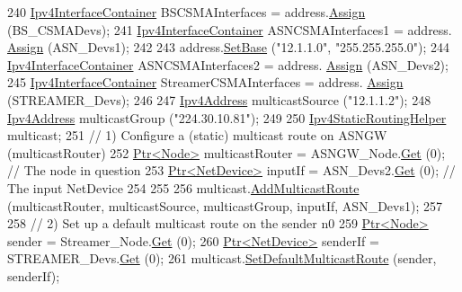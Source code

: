 \begin{DoxyCode}
240   \hyperlink{classns3_1_1Ipv4InterfaceContainer}{Ipv4InterfaceContainer} BSCSMAInterfaces = address.\hyperlink{classns3_1_1Ipv4AddressHelper_af8e7f4a1a7e74c00014a1eac445a27af}{Assign} (BS\_CSMADevs);
241   \hyperlink{classns3_1_1Ipv4InterfaceContainer}{Ipv4InterfaceContainer} ASNCSMAInterfaces1 = address.
      \hyperlink{classns3_1_1Ipv4AddressHelper_af8e7f4a1a7e74c00014a1eac445a27af}{Assign} (ASN\_Devs1);
242 
243   address.\hyperlink{classns3_1_1Ipv4AddressHelper_acf7b16dd25bac67e00f5e25f90a9a035}{SetBase} (\textcolor{stringliteral}{"12.1.1.0"}, \textcolor{stringliteral}{"255.255.255.0"});
244   \hyperlink{classns3_1_1Ipv4InterfaceContainer}{Ipv4InterfaceContainer} ASNCSMAInterfaces2 = address.
      \hyperlink{classns3_1_1Ipv4AddressHelper_af8e7f4a1a7e74c00014a1eac445a27af}{Assign} (ASN\_Devs2);
245   \hyperlink{classns3_1_1Ipv4InterfaceContainer}{Ipv4InterfaceContainer} StreamerCSMAInterfaces = address.
      \hyperlink{classns3_1_1Ipv4AddressHelper_af8e7f4a1a7e74c00014a1eac445a27af}{Assign} (STREAMER\_Devs);
246 
247   \hyperlink{classns3_1_1Ipv4Address}{Ipv4Address} multicastSource (\textcolor{stringliteral}{"12.1.1.2"});
248   \hyperlink{classns3_1_1Ipv4Address}{Ipv4Address} multicastGroup (\textcolor{stringliteral}{"224.30.10.81"});
249 
250   \hyperlink{classns3_1_1Ipv4StaticRoutingHelper}{Ipv4StaticRoutingHelper} multicast;
251   \textcolor{comment}{// 1) Configure a (static) multicast route on ASNGW (multicastRouter)}
252   \hyperlink{classns3_1_1Ptr}{Ptr<Node>} multicastRouter = ASNGW\_Node.\hyperlink{classns3_1_1NodeContainer_a9ed96e2ecc22e0f5a3d4842eb9bf90bf}{Get} (0); \textcolor{comment}{// The node in question}
253   \hyperlink{classns3_1_1Ptr}{Ptr<NetDevice>} inputIf = ASN\_Devs2.\hyperlink{classns3_1_1NetDeviceContainer_a677d62594b5c9d2dea155cc5045f4d0b}{Get} (0); \textcolor{comment}{// The input NetDevice}
254 
255 
256   multicast.\hyperlink{classns3_1_1Ipv4StaticRoutingHelper_aa8d55f28361e24aefb961fe2eddc2192}{AddMulticastRoute} (multicastRouter, multicastSource, multicastGroup, inputIf, 
      ASN\_Devs1);
257 
258   \textcolor{comment}{// 2) Set up a default multicast route on the sender n0}
259   \hyperlink{classns3_1_1Ptr}{Ptr<Node>} sender = Streamer\_Node.\hyperlink{classns3_1_1NodeContainer_a9ed96e2ecc22e0f5a3d4842eb9bf90bf}{Get} (0);
260   \hyperlink{classns3_1_1Ptr}{Ptr<NetDevice>} senderIf = STREAMER\_Devs.\hyperlink{classns3_1_1NetDeviceContainer_a677d62594b5c9d2dea155cc5045f4d0b}{Get} (0);
261   multicast.\hyperlink{classns3_1_1Ipv4StaticRoutingHelper_ae69a07ded3139dfd4e21bb7c10eba416}{SetDefaultMulticastRoute} (sender, senderIf);

\end{DoxyCode}

